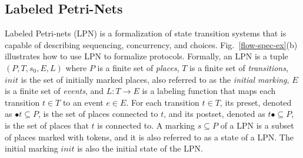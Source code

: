 \documentclass[conference]{IEEEtran}
\begin{document}

\subsection{Labeled Petri-Nets}

Labeled Petri-nets (LPN) is a formalization of state
transition systems that is capable of describing sequencing,
concurrency, and choices.  Fig.~\ref{flow-spec-ex}(b)
illustrates how to use LPN to formalize protocols.
Formally, an LPN is a tuple $(P, T, s_0, E, L)$ where $P$ is
a finite set of {\em places}, $T$ is a finite set of {\em
  transitions}, $\mathit{init}$ is the set of initially
marked places, also referred to as the {\em initial
  marking}, $E$ is a finite set of {\em events}, and $L: T
\rightarrow E$ is a labeling function that maps each
transition $t \in T$ to an event $e \in E$.  For each
transition $t \in T$, its preset, denoted as $\bullet{t}
\subseteq P$, is the set of places connected to $t$, and its
postset, denoted as $t\bullet \subseteq P$, is the set of
places that $t$ is connected to.  A marking $s \subseteq P$
of a LPN is a subset of places marked with tokens, and it is
also referred to as a state of a LPN.  The initial marking
$\mathit{init}$ is also the initial state of the LPN.





\end{document}
